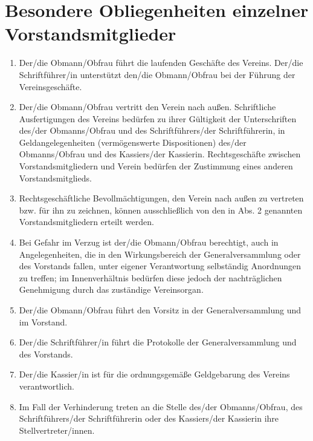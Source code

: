 \documentclass[a4paper,12pt]{article}
\begin{document}
\section{Besondere Obliegenheiten einzelner Vorstandsmitglieder} %
\label{sec:Vorstandsmitglieder}
\begin{enumerate}
\item Der/die Obmann/Obfrau führt die laufenden Geschäfte des Vereins. Der/die Schriftführer/in unterstützt den/die Obmann/Obfrau bei der Führung der Vereinsgeschäfte.
\item\label{item:vorstandsmitglieder-positionen} Der/die Obmann/Obfrau vertritt den Verein nach außen. Schriftliche Ausfertigungen des Vereins bedürfen zu ihrer Gültigkeit der Unterschriften des/der Obmanns/Obfrau und des Schriftführers/der Schriftführerin, in Geldangelegenheiten (vermögenswerte Dispositionen) des/der Obmanns/Obfrau und des Kassiers/der Kassierin. Rechtsgeschäfte zwischen Vorstandsmitgliedern und Verein bedürfen der Zustimmung eines anderen Vorstandsmitglieds.

\item Rechtsgeschäftliche Bevollmächtigungen, den Verein nach außen zu vertreten bzw. für ihn zu zeichnen, können ausschließlich von den in Abs. 2 genannten Vorstandsmitgliedern erteilt werden.

\item Bei Gefahr im Verzug ist der/die Obmann/Obfrau berechtigt, auch in Angelegenheiten, die in den Wirkungsbereich der Generalversammlung oder des Vorstands fallen, unter eigener Verantwortung selbständig Anordnungen zu treffen; im Innenverhältnis bedürfen diese jedoch der nachträglichen Genehmigung durch das zuständige Vereinsorgan.
\item Der/die Obmann/Obfrau führt den Vorsitz in der Generalversammlung und im Vorstand.
\item Der/die Schriftführer/in führt die Protokolle der Generalversammlung und des Vorstands.
\item Der/die Kassier/in ist für die ordnungsgemäße Geldgebarung des Vereins verantwortlich.
\item Im Fall der Verhinderung treten an die Stelle des/der Obmanns/Obfrau, des Schriftführers/der Schriftführerin oder des Kassiers/der Kassierin ihre Stellvertreter/innen.
\end{enumerate}
\end{document}
